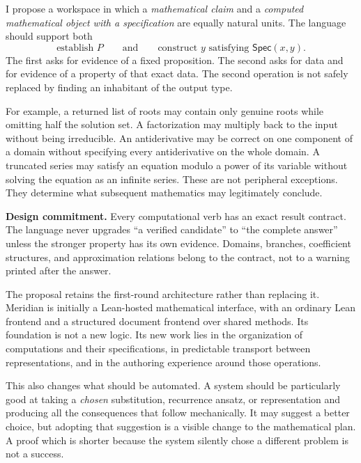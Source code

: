 \documentclass[11pt,a4paper]{article}
\newcommand{\Spec}{\mathsf{Spec}}
\theoremstyle{remark}
\begin{document}
I propose a workspace in which a \emph{mathematical claim} and a \emph{computed
mathematical object with a specification} are equally natural units. The language
should support both
\[
 \text{establish }P
 \qquad\text{and}\qquad
 \text{construct }y\text{ satisfying }\Spec(x,y).
\]
The first asks for evidence of a fixed proposition. The second asks for data and
for evidence of a property of that exact data. The second operation is not safely
replaced by finding an inhabitant of the output type.

For example, a returned list of roots may contain only genuine roots while
omitting half the solution set. A factorization may multiply back to the input
without being irreducible. An antiderivative may be correct on one component of
a domain without specifying every antiderivative on the whole domain. A
truncated series may satisfy an equation modulo a power of its variable without
solving the equation as an infinite series. These are not peripheral exceptions.
They determine what subsequent mathematics may legitimately conclude.

\begin{decisionbox}
\textbf{Design commitment.} Every computational verb has an exact result contract.
The language never upgrades ``a verified candidate'' to ``the complete answer''
unless the stronger property has its own evidence. Domains, branches, coefficient
structures, and approximation relations belong to the contract, not to a warning
printed after the answer.
\end{decisionbox}

The proposal retains the first-round architecture rather than replacing it.
Meridian is initially a Lean-hosted mathematical interface, with an ordinary Lean
frontend and a structured document frontend over shared methods. Its foundation
is not a new logic. Its new work lies in the organization of computations and
their specifications, in predictable transport between representations, and in
the authoring experience around those operations.

This also changes what should be automated. A system should be particularly good
at taking a \emph{chosen} substitution, recurrence ansatz, or representation and
producing all the consequences that follow mechanically. It may suggest a better
choice, but adopting that suggestion is a visible change to the mathematical
plan. A proof which is shorter because the system silently chose a different
problem is not a success.

\end{document}
